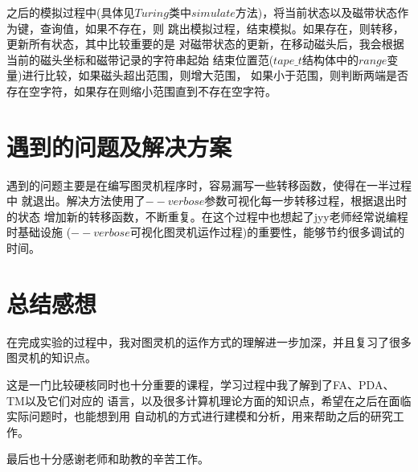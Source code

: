 \documentclass[a4paper,11pt]{ctexart}
\theoremstyle{mytheor}
\begin{document}
之后的模拟过程中(具体见$Turing$类中$simulate$方法)，将当前状态以及磁带状态作为键，查询值，如果不存在，则
跳出模拟过程，结束模拟。如果存在，则转移，更新所有状态，其中比较重要的是
对磁带状态的更新，在移动磁头后，我会根据当前的磁头坐标和磁带记录的字符串起始
结束位置范($tape\_t$结构体中的$range$变量)进行比较，如果磁头超出范围，则增大范围，
如果小于范围，则判断两端是否存在空字符，如果存在则缩小范围直到不存在空字符。

\section{遇到的问题及解决方案}

遇到的问题主要是在编写图灵机程序时，容易漏写一些转移函数，使得在一半过程中
就退出。解决方法使用了$--verbose$参数可视化每一步转移过程，根据退出时的状态
增加新的转移函数，不断重复。在这个过程中也想起了jyy老师经常说编程时基础设施
($--verbose$可视化图灵机运作过程)的重要性，能够节约很多调试的时间。

\section{总结感想}

在完成实验的过程中，我对图灵机的运作方式的理解进一步加深，并且复习了很多图灵机的知识点。

这是一门比较硬核同时也十分重要的课程，学习过程中我了解到了FA、PDA、TM以及它们对应的
语言，以及很多计算机理论方面的知识点，希望在之后在面临实际问题时，也能想到用
自动机的方式进行建模和分析，用来帮助之后的研究工作。

最后也十分感谢老师和助教的辛苦工作。
\end{document}
